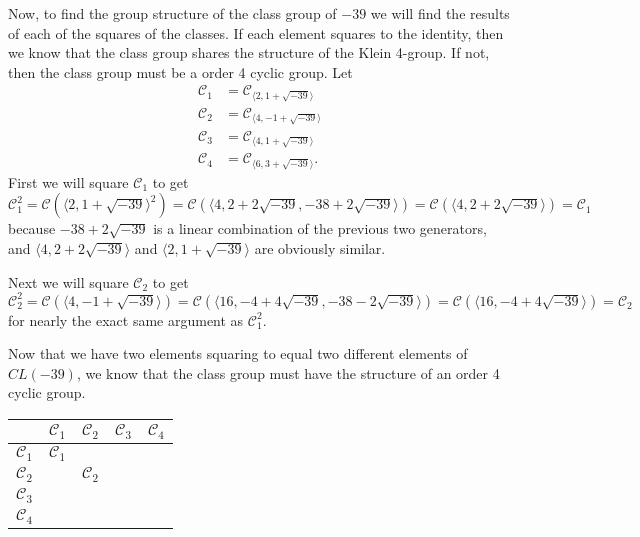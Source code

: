 \documentclass[12pt]{amsart}
\theoremstyle{definition}
\theoremstyle{remark}
\begin{document}
Now, to find the group structure of the class group of $-39$ we will find the results of each of the squares of the classes. If each element squares to the identity, then we know that the class group shares the structure of the Klein 4-group. If not, then the class group must be a order 4 cyclic group.
Let 
\begin{align*}
    \mathcal{C}_1 &= \mathcal{C}_{\langle 2 , 1+\sqrt{-39}\rangle}\\
    \mathcal{C}_2 &= \mathcal{C}_{\langle 4 , -1+\sqrt{-39}\rangle}\\
    \mathcal{C}_3 &= \mathcal{C}_{\langle 4 , 1+\sqrt{-39}\rangle}\\
    \mathcal{C}_4 &= \mathcal{C}_{\langle 6 , 3+\sqrt{-39}\rangle}.
\end{align*}
First we will square $\mathcal{C}_1$ to get 
$\mathcal{C}_1^2 = \mathcal{C}(\langle 2, 1+\sqrt{-39}\rangle^2) = \mathcal{C}(\langle 4, 2+2\sqrt{-39}, -38 + 2\sqrt{-39}\rangle) = \mathcal{C}(\langle 4, 2+2\sqrt{-39}\rangle) = \mathcal{C}_1$ because $-38 +2\sqrt{-39}$ is a linear combination of the previous two generators, and $\langle 4, 2+2\sqrt{-39}\rangle$ and $\langle 2, 1+\sqrt{-39}\rangle$ are obviously similar. 

Next we will square $\mathcal{C}_2$ to get
$\mathcal{C}_2^2 = \mathcal{C}(\langle 4,-1+\sqrt{-39}\rangle) = \mathcal{C}(\langle 16,-4+4\sqrt{-39},-38-2\sqrt{-39}\rangle) = \mathcal{C}(\langle 16,-4+4\sqrt{-39}\rangle) = \mathcal{C}_2$ for nearly the exact same argument as $\mathcal{C}_1^2$.

Now that we have two elements squaring to equal two different elements of $CL(-39)$, we know that the class group must have the structure of an order 4 cyclic group.

\begin{center}
    
\begin{tabular}{ |c|c|c|c|c| } 
         \hline
             & $\mathcal{C}_1$ & $\mathcal{C}_2$ & $\mathcal{C}_3$ & $\mathcal{C}_4$  \\ 
         \hline
            $\mathcal{C}_1$ & $\mathcal{C}_1$ &  &  &  \\ 
        \hline
            $\mathcal{C}_2$ &  & $\mathcal{C}_2$ &  &  \\ 
        \hline                 
            $\mathcal{C}_3$ &  &  &  &  \\ 
        \hline                 
            $\mathcal{C}_4$ &  &  &  &  \\ 
        \hline
    \end{tabular}\\
    \end{center}
        
\end{document}
